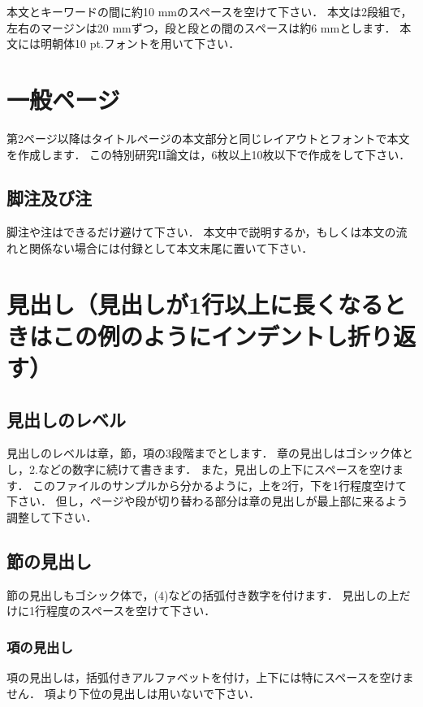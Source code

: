 本文とキーワードの間に約10 mmのスペースを空けて下さい．
本文は2段組で，左右のマージンは20 mmずつ，段と段との間のスペースは約6 mmとします．
本文には明朝体10 pt.フォントを用いて下さい．

\clearpage

\section{一般ページ}

第2ページ以降はタイトルページの本文部分と同じレイアウトとフォントで本文を作成します．
この特別研究II論文は，6枚以上10枚以下で作成をして下さい．

\subsection{脚注及び注}

脚注や注はできるだけ避けて下さい．
本文中で説明するか，もしくは本文の流れと関係ない場合には付録として本文末尾に置いて下さい．

\section{見出し（見出しが1行以上に長くなるときはこの例のようにインデントし折り返す）}

\subsection{見出しのレベル}

見出しのレベルは章，節，項の3段階までとします．
章の見出しはゴシック体とし，2.などの数字に続けて書きます．
また，見出しの上下にスペースを空けます．
このファイルのサンプルから分かるように，上を2行，下を1行程度空けて下さい．
但し，ページや段が切り替わる部分は章の見出しが最上部に来るよう調整して下さい．

\subsection{節の見出し}

節の見出しもゴシック体で，(4)などの括弧付き数字を付けます．
見出しの上だけに1行程度のスペースを空けて下さい．

\subsubsection{項の見出し}

項の見出しは，括弧付きアルファベットを付け，上下には特にスペースを空けません．
項より下位の見出しは用いないで下さい．

